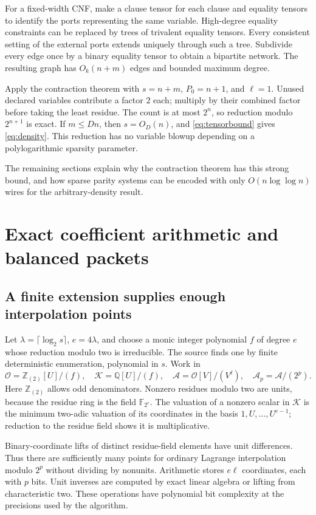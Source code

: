 \documentclass[11pt,a4paper]{article}
\numberwithin{equation}{section}
\theoremstyle{definition}
\theoremstyle{remark}
\newcommand{\Q}{\mathbb Q}
\newcommand{\Z}{\mathbb Z}
\newcommand{\F}{\mathbb F}
\begin{document}
For a fixed-width CNF, make a clause tensor for each clause and equality
tensors to identify the ports representing the same variable. High-degree
equality constraints can be replaced by trees of trivalent equality tensors.
Every consistent setting of the external ports extends uniquely through such
a tree. Subdivide every edge once by a binary equality tensor to obtain a
bipartite network. The resulting graph has $O_k(n+m)$ edges and bounded
maximum degree.

Apply the contraction theorem with $s=n+m$, $P_0=n+1$, and $\ell=1$.
Unused declared variables contribute a factor $2$ each; multiply by their
combined factor before taking the least residue. The count is at most $2^n$,
so reduction modulo $2^{n+1}$ is exact. If $m\le Dn$, then $s=O_D(n)$,
and \eqref{eq:tensorbound} gives \eqref{eq:density}. This reduction has no
variable blowup depending on a polylogarithmic sparsity parameter.

The remaining sections explain why the contraction theorem has this strong
bound, and how sparse parity systems can be encoded with only
$O(n\log\log n)$ wires for the arbitrary-density result.

\section{Exact coefficient arithmetic and balanced packets}
\label{sec:tensorpackets}
\subsection{A finite extension supplies enough interpolation points}
Let $\lambda=\lceil\log_2s\rceil$, $e=4\lambda$, and choose a monic integer
polynomial $f$ of degree $e$ whose reduction modulo two is irreducible. The
source finds one by finite deterministic enumeration, polynomial in $s$.
Work in
\[
 \mathcal O=\Z_{(2)}[U]/(f),\quad
 \mathcal K=\Q[U]/(f),\quad
 \mathcal A=\mathcal O[V]/(V^\ell),\quad
 \mathcal A_p=\mathcal A/(2^p).
\]
Here $\Z_{(2)}$ allows odd denominators. Nonzero residues modulo two are units,
because the residue ring is the field $\F_{2^e}$. The valuation of a nonzero
scalar in $\mathcal K$ is the minimum two-adic valuation of its coordinates
in the basis $1,U,\ldots,U^{e-1}$; reduction to the residue field shows it is
multiplicative.

Binary-coordinate lifts of distinct residue-field elements have unit
differences. Thus there are sufficiently many points for ordinary Lagrange
interpolation modulo $2^p$ without dividing by nonunits. Arithmetic stores
$e\ell$ coordinates, each with $p$ bits. Unit inverses are computed by exact
linear algebra or lifting from characteristic two. These operations have
polynomial bit complexity at the precisions used by the algorithm.
\end{document}
